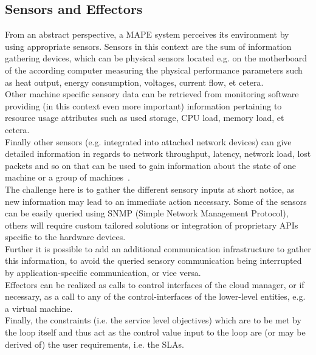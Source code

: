 \documentclass[a4paper]{llncs}
\begin{document}
\subsection{Sensors and Effectors}
From an abstract perspective, a MAPE system perceives its environment by using appropriate sensors. Sensors in this context are the sum of information gathering devices, which can be physical sensors located e.g. on the motherboard of the according computer measuring the physical performance parameters such as heat output, energy consumption, voltages, current flow, et cetera.\\
Other machine specific sensory data can be retrieved from monitoring software providing (in this context even more important) information pertaining to resource usage attributes such as used storage, CPU load, memory load, et cetera.\\
Finally other sensors (e.g. integrated into attached network devices) can give detailed information in regards to network throughput, latency, network load, lost packets and so on that can be used to gain information about the state of one machine or a group of machines~\cite{Gunter00}.\\

The challenge here is to gather the different sensory inputs at short notice, as new information may lead to an immediate action necessary. Some of the sensors can be easily queried using SNMP (Simple Network Management Protocol), others will require custom tailored solutions or integration of proprietary APIs specific to the hardware devices.\\
Further it is possible to add an additional communication infrastructure to gather this information, to avoid the queried sensory communication being interrupted by application-specific communication, or vice versa.\\

Effectors can be realized as calls to control interfaces of the cloud manager, or if necessary, as a call to any of the control-interfaces of the lower-level entities, e.g. a virtual machine.\\

Finally, the constraints (i.e. the service level objectives) which are to be met by the loop itself and thus act as the control value input to the loop are (or may be derived of) the user requirements, i.e. the SLAs.
\end{document}

